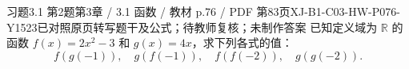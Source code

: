 \par\noindent\begin{minipage}{\linewidth}
\begin{bankitem}{习题3.1 第2题}{第3章 / 3.1 函数 / 教材 p.76 / PDF 第83页}{XJ-B1-C03-HW-P076-Y1523}{已对照原页转写题干及公式；待教师复核；未制作答案}
已知定义域为 $\mathbb R$ 的函数 $f(x)=2x^2-3$ 和 $g(x)=4x$，求下列各式的值：
\[f(g(-1)),\quad g(f(-1)),\quad f(f(-2)),\quad g(g(-2)).\]
\end{bankitem}
\end{minipage}\par\medskip
